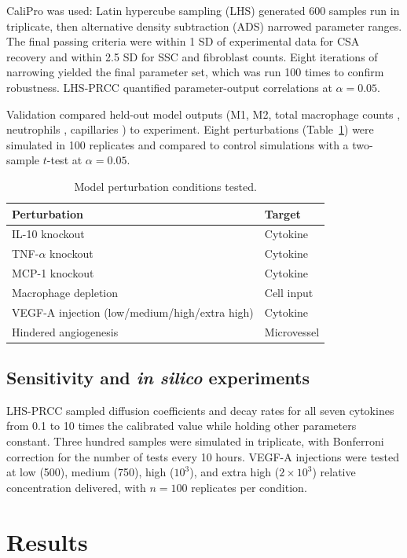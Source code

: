 \documentclass[11pt]{article}
\begin{document}
CaliPro \citep{r20} was used: Latin hypercube sampling (LHS) generated 600 samples run in triplicate, then alternative density subtraction (ADS) narrowed parameter ranges. The final passing criteria were within 1 SD of experimental data for CSA recovery and within 2.5 SD for SSC and fibroblast counts. Eight iterations of narrowing yielded the final parameter set, which was run 100 times to confirm robustness. LHS-PRCC \citep{r105,r106} quantified parameter-output correlations at $\alpha=0.05$.

Validation compared held-out model outputs (M1, M2, total macrophage counts \citep{r97,r107}, neutrophils \citep{r108}, capillaries \citep{r102}) to experiment. Eight perturbations (Table~\ref{tab:perturbations}) were simulated in 100 replicates and compared to control simulations with a two-sample $t$-test at $\alpha=0.05$.

\begin{table}[h]
\centering
\caption{Model perturbation conditions tested.}
\label{tab:perturbations}
\begin{tabular}{ll}
\toprule
Perturbation & Target \\
\midrule
IL-10 knockout            & Cytokine \\
TNF-$\alpha$ knockout     & Cytokine \\
MCP-1 knockout            & Cytokine \\
Macrophage depletion      & Cell input \\
VEGF-A injection (low/medium/high/extra high) & Cytokine \\
Hindered angiogenesis     & Microvessel \\
\bottomrule
\end{tabular}
\end{table}

\subsection{Sensitivity and \textit{in silico} experiments}
LHS-PRCC sampled diffusion coefficients and decay rates for all seven cytokines from 0.1 to 10 times the calibrated value while holding other parameters constant. Three hundred samples were simulated in triplicate, with Bonferroni correction for the number of tests every 10 hours. VEGF-A injections were tested at low (500), medium (750), high ($10^3$), and extra high ($2\times10^3$) relative concentration delivered, with $n=100$ replicates per condition.

\section{Results}
\end{document}
